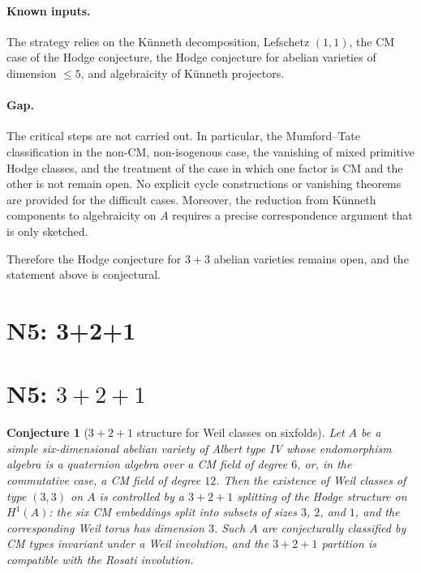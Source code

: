 \documentclass{article}
\newtheorem{conjecture}{Conjecture}
\begin{document}
\paragraph{Known inputs.}
The strategy relies on the K\"unneth decomposition, Lefschetz \((1,1)\), the CM case of the Hodge conjecture, the Hodge conjecture for abelian varieties of dimension \(\le 5\), and algebraicity of K\"unneth projectors.

\paragraph{Gap.}
The critical steps are not carried out. In particular, the Mumford--Tate classification in the non-CM, non-isogenous case, the vanishing of mixed primitive Hodge classes, and the treatment of the case in which one factor is CM and the other is not remain open. No explicit cycle constructions or vanishing theorems are provided for the difficult cases. Moreover, the reduction from K\"unneth components to algebraicity on \(A\) requires a precise correspondence argument that is only sketched.

Therefore the Hodge conjecture for \(3+3\) abelian varieties remains open, and the statement above is conjectural.

\section{N5: 3+2+1}
\section*{N5: \(3+2+1\)}

\begin{conjecture}[\(3+2+1\) structure for Weil classes on sixfolds]
Let \(A\) be a simple six-dimensional abelian variety of Albert type IV whose endomorphism algebra is a quaternion algebra over a CM field of degree \(6\), or, in the commutative case, a CM field of degree \(12\). Then the existence of Weil classes of type \((3,3)\) on \(A\) is controlled by a \(3+2+1\) splitting of the Hodge structure on \(H^1(A)\): the six CM embeddings split into subsets of sizes \(3\), \(2\), and \(1\), and the corresponding Weil torus has dimension \(3\). Such \(A\) are conjecturally classified by CM types invariant under a Weil involution, and the \(3+2+1\) partition is compatible with the Rosati involution.
\end{conjecture}
\end{document}
